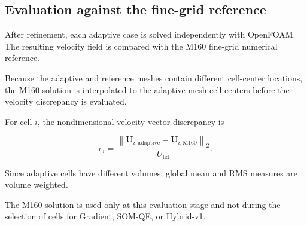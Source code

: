 \subsection{Evaluation against the fine-grid reference}

After refinement, each adaptive case is solved independently with OpenFOAM.
The resulting velocity field is compared with the M160 fine-grid numerical
reference.

Because the adaptive and reference meshes contain different cell-center
locations, the M160 solution is interpolated to the adaptive-mesh cell
centers before the velocity discrepancy is evaluated.

For cell \(i\), the nondimensional velocity-vector discrepancy is

\begin{equation}
e_i =
\frac{
\left\|
\mathbf{U}_{i,\mathrm{adaptive}}
-
\mathbf{U}_{i,\mathrm{M160}}
\right\|_2
}{
U_{\mathrm{lid}}
}.
\end{equation}

Since adaptive cells have different volumes, global mean and RMS measures are
volume weighted.

The M160 solution is used only at this evaluation stage and not during the
selection of cells for Gradient, SOM-QE, or Hybrid-v1.
